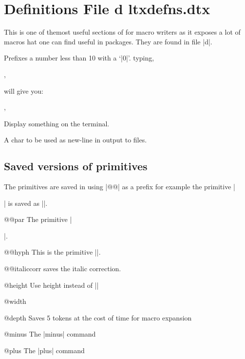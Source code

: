 \section{Definitions File d ltxdefns.dtx}
This is one of themost useful sections of \latex for macro writers as it exposes a lot of macros hat one can find useful in packages. They are found in file |d|.


 Prefixes a number less than 10 with a `|0|'.
typing,
\begin{teX}
,
\end{teX}

will give you:

\makeatletter
{},
\makeatother


 Display something on the terminal.

\begin{teX}
 \def\typeout#1{\begingroup\set@display@protect
 \immediate\write\@unused{#1}\endgroup}
\end{teX}

 A char to be used as new-line in output to files.



\subsection{Saved versions of primitives}

The \tex primitives are saved in \latex using |@@| as a prefix for example the \tex primitive |\par| is saved as |\@@par|.

\begin{trivlist}

\item @@par The \tex primitive |\par|.

\item @@hyph This is the \tex primitive |\-|.

\item @@italiccorr saves the italic correction.

\item @height Use height instead of |\height|

\item  @width

\item  @depth Saves 5 tokens at the cost of time for macro expansion

\item @minus The |minus| command

\item  @plus The |plus| command
\end{trivlist}


